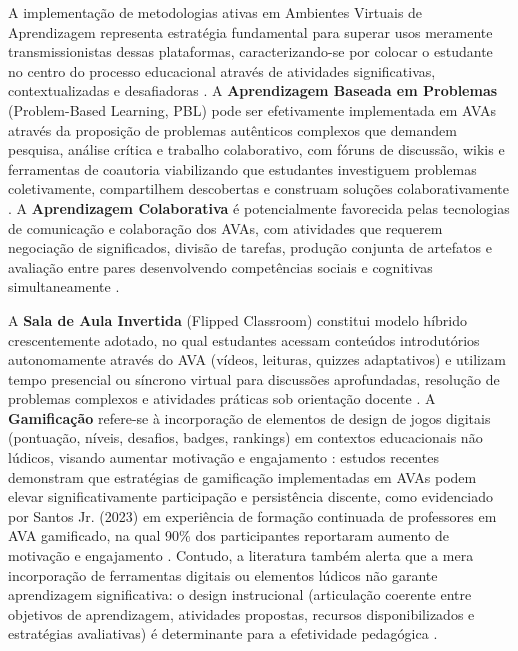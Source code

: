 \documentclass[portuguese]{sbc2025}%
\begin{document}
A implementação de metodologias ativas em Ambientes Virtuais de Aprendizagem representa estratégia fundamental para superar usos meramente transmissionistas dessas plataformas, caracterizando-se por colocar o estudante no centro do processo educacional através de atividades significativas, contextualizadas e desafiadoras \cite{Bates2015}. A \textbf{Aprendizagem Baseada em Problemas} (Problem-Based Learning, PBL) pode ser efetivamente implementada em AVAs através da proposição de problemas autênticos complexos que demandem pesquisa, análise crítica e trabalho colaborativo, com fóruns de discussão, wikis e ferramentas de coautoria viabilizando que estudantes investiguem problemas coletivamente, compartilhem descobertas e construam soluções colaborativamente \cite{Garrison2016}. A \textbf{Aprendizagem Colaborativa} é potencialmente favorecida pelas tecnologias de comunicação e colaboração dos AVAs, com atividades que requerem negociação de significados, divisão de tarefas, produção conjunta de artefatos e avaliação entre pares desenvolvendo competências sociais e cognitivas simultaneamente \cite{Dillenbourg1999}.

A \textbf{Sala de Aula Invertida} (Flipped Classroom) constitui modelo híbrido crescentemente adotado, no qual estudantes acessam conteúdos introdutórios autonomamente através do AVA (vídeos, leituras, quizzes adaptativos) e utilizam tempo presencial ou síncrono virtual para discussões aprofundadas, resolução de problemas complexos e atividades práticas sob orientação docente \cite{Graham2006}. A \textbf{Gamificação} refere-se à incorporação de elementos de design de jogos digitais (pontuação, níveis, desafios, badges, rankings) em contextos educacionais não lúdicos, visando aumentar motivação e engajamento \cite{Deterding2011, Kapp2012}: estudos recentes demonstram que estratégias de gamificação implementadas em AVAs podem elevar significativamente participação e persistência discente, como evidenciado por Santos Jr. (2023) em experiência de formação continuada de professores em AVA gamificado, na qual 90\% dos participantes reportaram aumento de motivação e engajamento \cite{Santos2023_gamification}. Contudo, a literatura também alerta que a mera incorporação de ferramentas digitais ou elementos lúdicos não garante aprendizagem significativa: o design instrucional (articulação coerente entre objetivos de aprendizagem, atividades propostas, recursos disponibilizados e estratégias avaliativas) é determinante para a efetividade pedagógica \cite{Bates2015, Garrison2016}.
\end{document}
